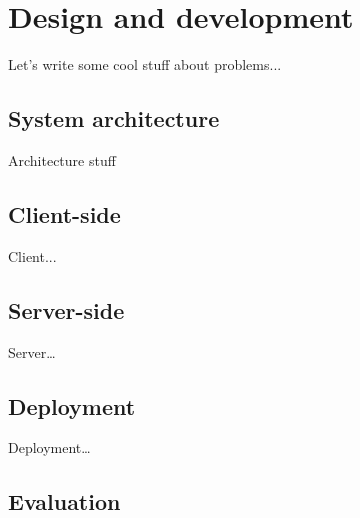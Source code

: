 \section{Design and development}

Let's write some cool stuff about problems...


\subsection{System architecture}

Architecture stuff

\subsection{Client-side}

Client...

\subsection{Server-side}

Server\dots

\subsection{Deployment}

Deployment\dots

\subsection{Evaluation}